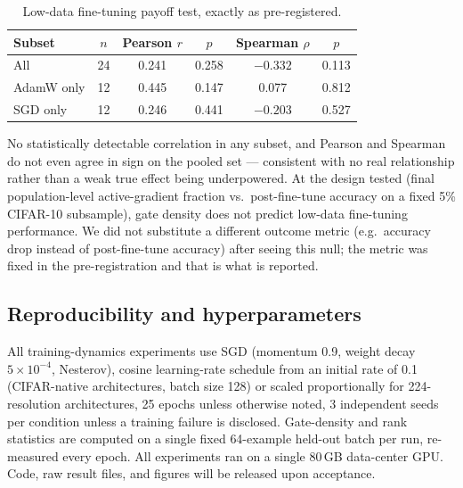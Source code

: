 \begin{table}[h]
\centering
\caption{Low-data fine-tuning payoff test, exactly as pre-registered.}
\label{tab:payoff}
\begin{tabular}{lccccc}
\toprule
Subset & $n$ & Pearson $r$ & $p$ & Spearman $\rho$ & $p$\\
\midrule
All & 24 & 0.241 & 0.258 & $-0.332$ & 0.113\\
AdamW only & 12 & 0.445 & 0.147 & 0.077 & 0.812\\
SGD only & 12 & 0.246 & 0.441 & $-0.203$ & 0.527\\
\bottomrule
\end{tabular}
\end{table}

No statistically detectable correlation in any subset, and Pearson and
Spearman do not even agree in sign on the pooled set --- consistent with no
real relationship rather than a weak true effect being underpowered. At
the design tested (final population-level active-gradient fraction vs.\
post-fine-tune accuracy on a fixed 5\% CIFAR-10 subsample), gate density
does not predict low-data fine-tuning performance. We did not substitute a
different outcome metric (e.g.\ accuracy drop instead of post-fine-tune
accuracy) after seeing this null; the metric was fixed in the
pre-registration and that is what is reported.

\subsection{Reproducibility and hyperparameters}
\label{app:repro}

All training-dynamics experiments use SGD (momentum 0.9, weight decay
$5\times10^{-4}$, Nesterov), cosine learning-rate schedule from an initial
rate of 0.1 (CIFAR-native architectures, batch size 128) or scaled
proportionally for 224-resolution architectures, 25 epochs unless
otherwise noted, 3 independent seeds per condition unless a training
failure is disclosed. Gate-density and rank statistics are computed on a
single fixed 64-example held-out batch per run, re-measured every epoch.
All experiments ran on a single 80\,GB data-center GPU. Code, raw result
files, and figures will be released upon acceptance.


